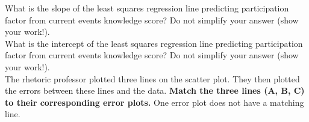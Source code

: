 \begin{enumerate}
 What is the slope of the least squares regression line predicting participation factor from current events knowledge score? Do not simplify your answer (show your work!).\\
\vskip 0.5in
 What is the intercept of the least squares regression line predicting participation factor from current events knowledge score? Do not simplify your answer (show your work!).\\
\clearpage
{} The rhetoric professor plotted three lines on the scatter plot. They then plotted the errors between these lines and the data. \textbf{Match the three lines (A, B, C) to their corresponding error plots.} One error plot does not have a matching line.
\vskip 0.1in


\end{enumerate}
